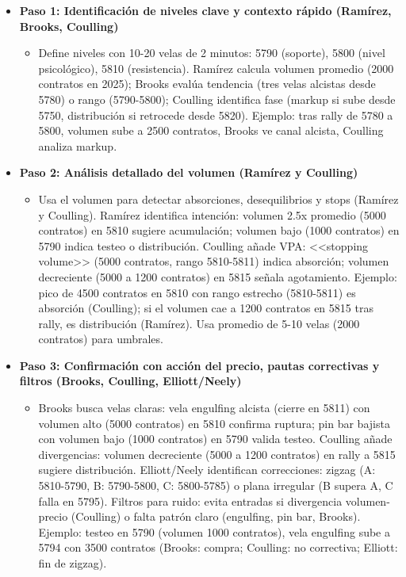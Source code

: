 \begin{itemize}
    \item \textbf{Paso 1: Identificaci\'{o}n de niveles clave y contexto r\'{a}pido (Ram\'irez, Brooks, Coulling)}
    \begin{itemize}
        \item Define niveles con 10-20 velas de 2 minutos: 5790 (soporte), 5800 (nivel psicol\'{o}gico), 5810 (resistencia). Ram\'irez calcula volumen promedio (2000 contratos en 2025); Brooks eval\'{u}a tendencia (tres velas alcistas desde 5780) o rango (5790-5800); Coulling identifica fase (markup si sube desde 5750, distribuci\'{o}n si retrocede desde 5820). Ejemplo: tras rally de 5780 a 5800, volumen sube a 2500 contratos, Brooks ve canal alcista, Coulling analiza markup.
    \end{itemize}

    \item \textbf{Paso 2: An\'{a}lisis detallado del volumen (Ram\'irez y Coulling)}
    \begin{itemize}
        \item Usa el volumen para detectar absorciones, desequilibrios y stops (Ram\'irez y Coulling). Ram\'irez identifica intenci\'{o}n: volumen 2.5x promedio (5000 contratos) en 5810 sugiere acumulaci\'{o}n; volumen bajo (1000 contratos) en 5790 indica testeo o distribuci\'{o}n. Coulling a\~{n}ade VPA: <<stopping volume>> (5000 contratos, rango 5810-5811) indica absorci\'{o}n; volumen decreciente (5000 a 1200 contratos) en 5815 se\~{n}ala agotamiento. Ejemplo: pico de 4500 contratos en 5810 con rango estrecho (5810-5811) es absorci\'{o}n (Coulling); si el volumen cae a 1200 contratos en 5815 tras rally, es distribuci\'{o}n (Ram\'irez). Usa promedio de 5-10 velas (2000 contratos) para umbrales.
    \end{itemize}

    \item \textbf{Paso 3: Confirmaci\'{o}n con acci\'{o}n del precio, pautas correctivas y filtros (Brooks, Coulling, Elliott/Neely)}
    \begin{itemize}
        \item Brooks busca velas claras: vela engulfing alcista (cierre en 5811) con volumen alto (5000 contratos) en 5810 confirma ruptura; pin bar bajista con volumen bajo (1000 contratos) en 5790 valida testeo. Coulling a\~{n}ade divergencias: volumen decreciente (5000 a 1200 contratos) en rally a 5815 sugiere distribuci\'{o}n. Elliott/Neely identifican correcciones: zigzag (A: 5810-5790, B: 5790-5800, C: 5800-5785) o plana irregular (B supera A, C falla en 5795). Filtros para ruido: evita entradas si divergencia volumen-precio (Coulling) o falta patr\'on claro (engulfing, pin bar, Brooks). Ejemplo: testeo en 5790 (volumen 1000 contratos), vela engulfing sube a 5794 con 3500 contratos (Brooks: compra; Coulling: no correctiva; Elliott: fin de zigzag).
    \end{itemize}


\end{itemize}
